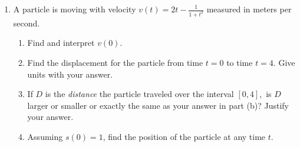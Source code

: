 \documentclass[11pt,fleqn]{article}
\begin{document}
\begin{enumerate}
\item A particle is moving with velocity $v(t) = 2t - \frac{1}{1+t^2}$ measured in meters per second.
	\begin{enumerate}
	\item Find and interpret $v(0).$
	\vspace{1in}
	\item Find the displacement for the particle from time $t=0$ to time $t=4.$ Give units with your answer.
	\vfill
	\item If $D$ is the \emph{distance} the particle traveled over the interval $[0,4],$ is $D$ larger or 	smaller or exactly the same as your answer in part (b)? Justify your answer.
	\vfill
	\item Assuming $s(0) = 1$, find the position of the particle at any time $t$. 
	\vfill
	\end{enumerate}
\end{enumerate}
\end{document}
